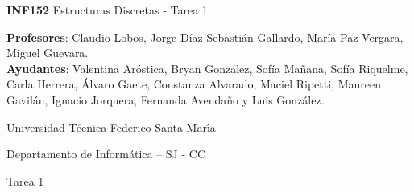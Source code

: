 \documentclass[letterpaper,10pt]{article}
\begin{document}
\thispagestyle{empty}
 	
\begin{minipage}[t]{0.6\textwidth}

{\LARGE \textbf{INF152} Estructuras Discretas - Tarea 1}

{\large \textbf{Profesores}: Claudio Lobos, Jorge Díaz Sebastián Gallardo, María Paz Vergara, Miguel Guevara.}\\
{\small \textbf{Ayudantes}: Valentina Aróstica, Bryan González, Sofía Mañana, Sofía Riquelme, Carla Herrera, Álvaro Gaete, Constanza Alvarado, Maciel Ripetti, Maureen Gavilán, Ignacio Jorquera, Fernanda Avendaño y Luis González.} 

Universidad T\'ecnica Federico Santa Mar\'{\i}a

Departamento de Inform\'atica -- SJ - CC 



\end{minipage}
\hfill



\vspace{0.3cm}


\begin{center}
    \huge Tarea 1
\end{center}
\end{document}

